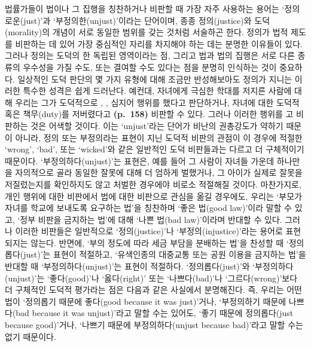 법률가들이 법이나 그 집행을 칭찬하거나 비판할 때 가장 자주 사용하는
용어는 `정의로운(just)'과 `부정의한(unjust)'이라는 단어이며, 종종
정의(justice)와 도덕(morality)의 개념이 서로 동일한 범위를 갖는 것처럼
서술하곤 한다. 정의가 법적 제도를 비판하는 데 있어 가장 중심적인 자리를
차지해야 하는 데는 분명한 이유들이 있다. 그러나 정의는 도덕의 한 독립된
영역이라는 점, 그리고 법과 법의 집행은 서로 다른 종류의 우수성을 가질
수도, 또는 결여할 수도 있다는 점을 분명히 인식하는 것이 중요하다.
일상적인 도덕 판단의 몇 가지 유형에 대해 조금만 반성해보아도 정의가
지니는 이러한 특수한 성격은 쉽게 드러난다. 예컨대, 자녀에게 극심한
학대를 저지른 사람에 대해 우리는 그가 도덕적으로 ,
, 심지어  행위를 했다고 판단하거나,
자녀에 대한 도덕적  혹은 책무(duty)를 저버렸다고
\textbf{(p.~158)} 비판할 수 있다. 그러나 이러한 행위를
고 비판하는 것은 어색할 것이다. 이는
`unjust'라는 단어가 비난의 권총강도가 약하기 때문이 아니라, 정의 또는
부정의라는 표현이 지닌 도덕적 비판의 관점이 이 경우에 적절한 `wrong',
`bad', 또는 `wicked'와 같은 일반적인 도덕 비판들과는 다르고 더
구체적이기 때문이다. `부정의하다(unjust)'는 표현은, 예를 들어 그 사람이
자녀들 가운데 하나만을 자의적으로 골라 동일한 잘못에 대해 더 엄하게
벌했거나, 그 아이가 실제로 잘못을 저질렀는지를 확인하지도 않고 처벌한
경우에야 비로소 적절해질 것이다. 마찬가지로, 개인 행위에 대한 비판에서
법에 대한 비판으로 관심을 옮길 경우에도, 우리는 `부모가 자녀를 학교에
보내도록 요구하는 법'을 칭찬하며 `좋은 법(good law)'이라 말할 수 있고,
`정부 비판을 금지하는 법'에 대해 `나쁜 법(bad law)'이라며 반대할 수
있다. 그러나 이러한 비판들은 일반적으로 `정의(justice)'나
`부정의(injustice)'라는 용어로 표현되지는 않는다. 반면에, `부의 정도에
따라 세금 부담을 분배하는 법'을 찬성할 때 `정의롭다(just)'는 표현이
적절하고, `유색인종의 대중교통 또는 공원 이용을 금지하는 법'을 반대할 때
`부정의하다(unjust)'는 표현이 적절하다. `정의롭다(just)'와
`부정의하다(unjust)'는 `좋다(good)'나 `옳다(right)' 또는 `나쁘다(bad)'나
`그르다(wrong)'보다 더 구체적인 도덕적 평가라는 점은 다음과 같은
사실에서 분명해진다. 즉, 우리는 어떤 법이 `정의롭기 때문에 좋다(good
because it was just)'거나, `부정의하기 때문에 나쁘다(bad because it was
unjust)'라고 말할 수는 있어도, `좋기 때문에 정의롭다(just because
good)'거나, `나쁘기 때문에 부정의하다(unjust because bad)'라고 말할 수는
없기 때문이다.

